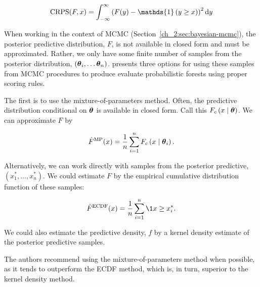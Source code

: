 \begin{equation}
    \operatorname{CRPS}(F, x) = \int_{-\infty}^{\infty} \left( F(y) - \mathds{1} \left( y \geq x \right) \right)^2 \rmd y
    \label{ch_2:eqn:crps}
\end{equation}

When working in the context of MCMC (Section~\ref{ch_2:sec:bayesian-mcmc}), the posterior predictive distribution, \( F \), is not available in closed form and must be approximated.
Rather, we only have some finite number of samples from the posterior distribution, \( \left( \boldsymbol{\theta}_i, \ldots \boldsymbol{\theta}_n \right) \).
\citet{kruger2021predictive} presents three options for using these samples from MCMC procedures to produce evaluate probabilistic forests using proper scoring rules.

The first is to use the mixture-of-parameters method.
Often, the predictive distribution conditional on \( \boldsymbol{\theta} \) is available in closed form.
Call this \( F_c \left( x \mid \boldsymbol{\theta} \right) \).
We can approximate \( F \) by 

\begin{equation}
    \hat{F}^\mathrm{MP}(x) = \frac{1}{n} \sum_{i=1}^n F_c \left( x \mid \boldsymbol{\theta}_i \right).
\end{equation}

Alternatively, we can work directly with samples from the posterior predictive, \( \left( x^*_1, \ldots, x^*_n \right) \).
We could estimate \( F \) by the empirical cumulative distribution function of these samples:

\begin{equation}
    \hat{F}^\mathrm{ECDF}(x) = \frac{1}{n} \sum_{i=1}^n \1{x \geq x^*_i}.
\end{equation}

We could also estimate the predictive density, \( f \) by a kernel density estimate of the posterior predictive samples.

The authors recommend using the mixture-of-parameters method when possible, as it tends to outperform the ECDF method, which is, in turn, superior to the kernel density method.

